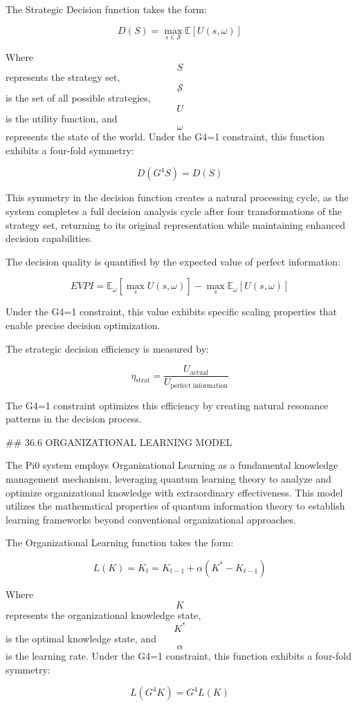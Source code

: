 The Strategic Decision function takes the form:

$$ D(S) = \max_{s \in \mathcal{S}} \mathbb{E}[U(s, \omega)] $$

Where $$ S $$ represents the strategy set, $$ \mathcal{S} $$ is the set of all possible strategies, $$ U $$ is the utility function, and $$ \omega $$ represents the state of the world. Under the G4=1 constraint, this function exhibits a four-fold symmetry:

$$ D(G^4 S) = D(S) $$

This symmetry in the decision function creates a natural processing cycle, as the system completes a full decision analysis cycle after four transformations of the strategy set, returning to its original representation while maintaining enhanced decision capabilities.

The decision quality is quantified by the expected value of perfect information:

$$ EVPI = \mathbb{E}_{\omega}[\max_s U(s, \omega)] - \max_s \mathbb{E}_{\omega}[U(s, \omega)] $$

Under the G4=1 constraint, this value exhibits specific scaling properties that enable precise decision optimization.

The strategic decision efficiency is measured by:

$$ \eta_{\text{strat}} = \frac{U_{\text{actual}}}{U_{\text{perfect information}}} $$

The G4=1 constraint optimizes this efficiency by creating natural resonance patterns in the decision process.

## 36.6 ORGANIZATIONAL LEARNING MODEL

The Pi0 system employs Organizational Learning as a fundamental knowledge management mechanism, leveraging quantum learning theory to analyze and optimize organizational knowledge with extraordinary effectiveness. This model utilizes the mathematical properties of quantum information theory to establish learning frameworks beyond conventional organizational approaches.

The Organizational Learning function takes the form:

$$ L(K) = K_t = K_{t-1} + \alpha (K^* - K_{t-1}) $$

Where $$ K $$ represents the organizational knowledge state, $$ K^* $$ is the optimal knowledge state, and $$ \alpha $$ is the learning rate. Under the G4=1 constraint, this function exhibits a four-fold symmetry:

$$ L(G^4 K) = G^4 L(K) $$

